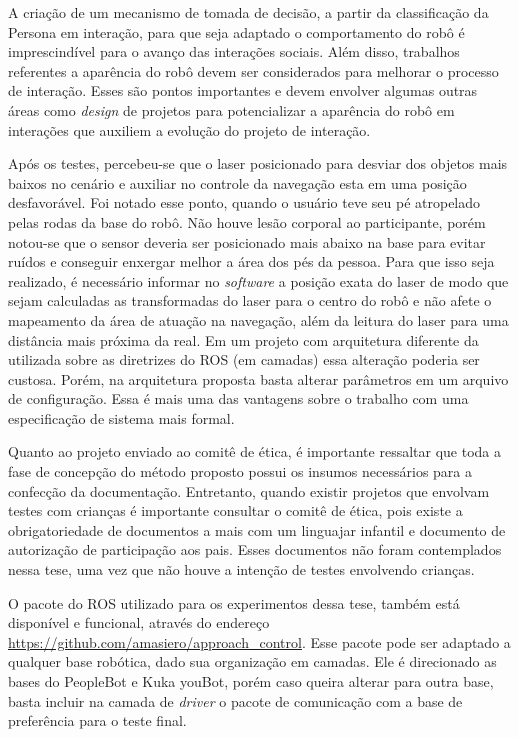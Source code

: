 A criação de um mecanismo de tomada de decisão, a partir da classificação da Persona em interação, para que seja adaptado o comportamento do robô é imprescindível para o avanço das interações sociais. Além disso, trabalhos referentes a aparência do robô devem ser considerados para melhorar o processo de interação. Esses são pontos importantes e devem envolver algumas outras áreas como \textit{design} de projetos para potencializar a aparência do robô em interações que auxiliem a evolução do projeto de interação.

Após os testes, percebeu-se que o laser posicionado para desviar dos objetos mais baixos no cenário e auxiliar no controle da navegação esta em uma posição desfavorável. Foi notado esse ponto, quando o usuário teve seu pé atropelado pelas rodas da base do robô. Não houve lesão corporal ao participante, porém notou-se que o sensor deveria ser posicionado mais abaixo na base para evitar ruídos e conseguir enxergar melhor a área dos pés da pessoa. Para que isso seja realizado, é necessário informar no \textit{software} a posição exata do laser de modo que sejam calculadas as transformadas do laser para o centro do robô e não afete o mapeamento da área de atuação na navegação, além da leitura do laser para uma distância mais próxima da real. Em um projeto com arquitetura diferente da utilizada sobre as diretrizes do ROS (em camadas) essa alteração poderia ser custosa. Porém, na arquitetura proposta basta alterar parâmetros em um arquivo de configuração. Essa é mais uma das vantagens sobre o trabalho com uma especificação de sistema mais formal.

Quanto ao projeto enviado ao comitê de ética, é importante ressaltar que toda a fase de concepção do método proposto possui os insumos necessários para a confecção da documentação. Entretanto, quando existir projetos que envolvam testes com crianças é importante consultar o comitê de ética, pois existe a obrigatoriedade de documentos a mais com um linguajar infantil e documento de autorização de participação aos pais. Esses documentos não foram contemplados nessa tese, uma vez que não houve a intenção de testes envolvendo crianças.

O pacote do ROS utilizado para os experimentos dessa tese, também está disponível e funcional, através do endereço \url{https://github.com/amasiero/approach\_control}. Esse pacote pode ser adaptado a qualquer base robótica, dado sua organização em camadas. Ele é direcionado as bases do PeopleBot e Kuka youBot, porém caso queira alterar para outra base, basta incluir na camada de \textit{driver} o pacote de comunicação com a base de preferência para o teste final.


